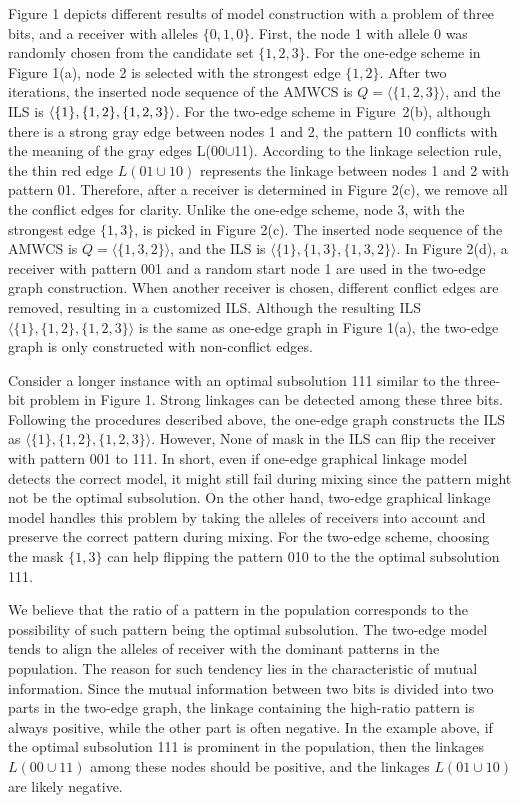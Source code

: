\documentclass{sig-alternate-05-2015}
\begin{document}
Figure 1 depicts different results of model construction with  a problem of three bits, and a receiver with alleles $\{0, 1, 0\}$. First, the node 1 with allele 0 was randomly chosen from the candidate set $\{1, 2, 3\}$. For the one-edge scheme in Figure 1(a), node 2 is selected with the strongest edge $\{1, 2\}$. After two iterations, the inserted node sequence of the AMWCS  is $Q = \langle\{1, 2, 3\}\rangle$, and the ILS is  $\langle\{1\}, \{1, 2\}, \\ \{1, 2, 3\}\rangle$. For the two-edge scheme in Figure~2(b), although there is a strong gray edge between nodes 1 and 2,  the pattern 10 conflicts with the meaning of the gray edges L(00$\cup$11). According to the linkage selection rule, the thin red edge $L(01\cup10)$ represents the linkage between nodes 1 and 2 with pattern 01. Therefore, after a receiver is determined in Figure 2(c), we remove all the conflict edges for clarity. Unlike the one-edge scheme, node 3, with the strongest edge $\{1, 3\}$, is picked in Figure 2(c). The inserted node sequence of the AMWCS is $Q = \langle\{1, 3, 2\}\rangle$,  and the ILS is $\langle\{1\}, \{1, 3\}, \{1, 3, 2\}\rangle$. In Figure 2(d), a receiver with pattern 001 and a random start node 1 are used in the two-edge graph construction. When another receiver is chosen, different conflict edges are removed, resulting in a customized ILS. Although the resulting ILS  $\langle\{1\}, \{1, 2\}, \{1, 2, 3\}\rangle$ is the same as one-edge graph in Figure 1(a), the two-edge graph is only constructed with non-conflict edges. 

Consider a longer instance with an optimal subsolution 111 similar to the three-bit problem in Figure 1. Strong linkages can be detected among these three bits. Following the procedures described above, the one-edge graph constructs the ILS as $\langle\{1\}, \{1, 2\}, \{1, 2, 3\}\rangle$. However, None of mask in the ILS can flip the receiver with pattern 001 to 111. In short, even if one-edge graphical linkage model detects the correct model, it might still fail during mixing since the pattern might not be the optimal subsolution. On the other hand, two-edge graphical linkage model  handles this problem by taking the alleles of receivers into account and preserve the correct pattern during mixing. For the two-edge scheme, choosing the mask $\{1, 3\}$ can help flipping the pattern 010 to the the optimal subsolution 111.   

We believe that the ratio of a pattern in the population corresponds to the possibility of such pattern being the optimal subsolution. The two-edge model tends to align the alleles of receiver  with the dominant patterns in the population. The reason for such tendency lies in the characteristic of mutual information. Since the mutual information between two bits is divided into two parts in the two-edge graph,  the  linkage containing the high-ratio pattern  is always positive, while the other part is often negative.  In the example above, if the optimal subsolution 111 is prominent in the population, then the linkages $L(00\cup11)$ among these nodes should be positive, and the linkages $L(01\cup10)$ are likely negative.  
\end{document}
